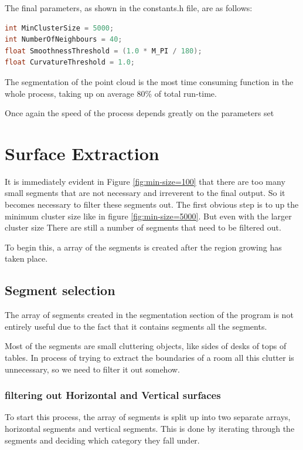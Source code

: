 		The final parameters, as shown in the constants.h file, are as follows:

		\begin{lstlisting}[frame = single, language = c++]
int MinClusterSize = 5000;
int NumberOfNeighbours = 40;
float SmoothnessThreshold = (1.0 * M_PI / 180);
float CurvatureThreshold = 1.0;
		\end{lstlisting}
			
	
			The segmentation of the point cloud is the most time consuming function in the whole process, taking up on average 80\% of total run-time.
			
			Once again the speed of the process depends greatly on the parameters set
		
		

	\section{Surface Extraction}
	
	It is immediately evident in Figure \ref{fig:min-size=100} that there are too many small segments that are not necessary and irreverent to the final output. So it becomes necessary to filter these segments out. The first obvious step is to up the minimum cluster size like in figure \ref{fig:min-size=5000}. But even with the larger cluster size There are still a number of segments that need to be filtered out.
	
	To begin this, a array of the segments is created after the region growing has taken place.


	\subsection{Segment selection}
		The array of segments created in the segmentation section of the program is not entirely useful due to the fact that it contains segments all the segments.
		
		Most of the segments are small cluttering objects, like sides of desks of tops of tables. In process of trying to extract the boundaries of a room all this clutter is unnecessary, so we need to filter it out somehow.
		\subsubsection{filtering out Horizontal and Vertical surfaces}
			To start this process, the array of segments is split up into two separate arrays, horizontal segments and vertical segments. This is done by iterating through the segments and deciding which category they fall under.
			
